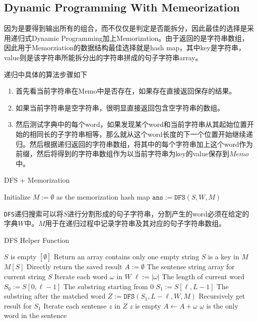 \subsection{Dynamic Programming With Memeorization}
因为是要得到输出所有的组合，而不仅仅是判定是否能拆分，因此最佳的选择是采用递归式Dynamic Programming加上Memorization。由于返回的是字符串数组，因此用于Memorziation的数据结构最佳选择就是hash map，其中key是字符串，value则是该字符串所能拆分出的字符串拼成的句子字符串array。
\par
递归中具体的算法步骤如下
\begin{enumerate}
    \item 首先看当前字符串在Memo中是否存在，如果存在直接返回保存的结果。
    \item 如果当前字符串是空字符串，很明显直接返回包含空字符串的数组。
    \item 然后测试字典中的每个word，如果发现某个word和当前字符串从其起始位置开始的相同长的子字符串相等，那么就从这个word长度的下一个位置开始继续递归。然后根据递归返回的字符串数组，将其中的每个字符串加上这个word作为前缀，然后将得到的字符串数组作为以当前字符串为key的value保存到$Memo$中。
\end{enumerate}
\setcounter{algorithm}{0}
\begin{algorithm}[H]
\caption{DFS + Memorization}
\begin{algorithmic}[1]
\State Initialize $M:=\emptyset$ as the memorization hash map
\State $\texttt{ans}:=\texttt{DFS}(S, W, M)$
\EndProcedure
\end{algorithmic}
\end{algorithm}
\texttt{DFS}递归搜索可以将$S$进行分割形成的句子字符串，分割产生的word必须在给定的字典$W$中。$M$用于在递归过程中记录字符串及其对应的句子字符串数组。
\begin{algorithm}[H]
\caption{DFS Helper Function}
\begin{algorithmic}[1]
 \Comment $S$ is empty
\State \Return $[\emptyset]$ \Comment Return an array contains only one empty string
\EndIf
{} \Comment $S$ is a key in $M$
\State \Return $M[S]$ \Comment Directly return the saved result
\EndIf
\State $A:=\emptyset$ \Comment The sentense string array for current string $S$
 \Comment Iterate each word $\omega$ in $W$
\State $\ell:=|\omega|$ \Comment The length of current word
\State $S_0:=S[0,\ell-1]$ \Comment The substring starting from 0
 \label{140if2}
\State $S_1:=S[\ell, L-1]$ \Comment The substring after the matched word
\State $Z:=\texttt{DFS}(S_1, L-\ell, W, M)$ \Comment Recursively get result for $S_1$ 
 \Comment Iterate each sentense $z$ in $Z$ \label{140for1}
 \Comment $z$ is empty \label{140if1}
\State $A\gets A + \omega$ \Comment $\omega$ is the only word in the sentence
\end{algorithmic}
\end{algorithm}
